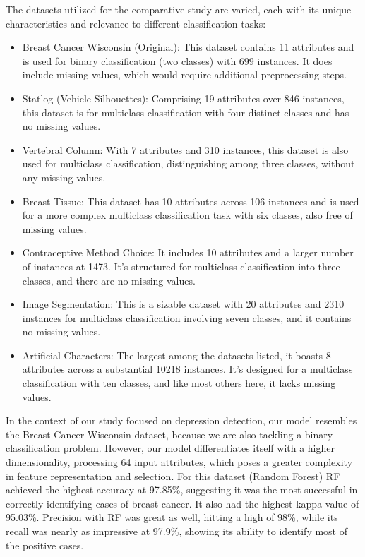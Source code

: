 The datasets utilized for the comparative study are varied, each with its unique characteristics and relevance to different classification tasks:
\begin{itemize}
 
\item Breast Cancer Wisconsin (Original): This dataset contains 11 attributes and is used for binary classification (two classes) with 699 instances. It does include missing values, which would require additional preprocessing steps.

\item Statlog (Vehicle Silhouettes): Comprising 19 attributes over 846 instances, this dataset is for multiclass classification with four distinct classes and has no missing values.

\item Vertebral Column: With 7 attributes and 310 instances, this dataset is also used for multiclass classification, distinguishing among three classes, without any missing values.

\item Breast Tissue: This dataset has 10 attributes across 106 instances and is used for a more complex multiclass classification task with six classes, also free of missing values.

\item Contraceptive Method Choice: It includes 10 attributes and a larger number of instances at 1473. It’s structured for multiclass classification into three classes, and there are no missing values.

\item Image Segmentation: This is a sizable dataset with 20 attributes and 2310 instances for multiclass classification involving seven classes, and it contains no missing values.

\item Artificial Characters: The largest among the datasets listed, it boasts 8 attributes across a substantial 10218 instances. It’s designed for a multiclass classification with ten classes, and like most others here, it lacks missing values.

\end{itemize}

In the context of our study focused on depression detection, our model resembles the Breast Cancer Wisconsin dataset, because we are also tackling a binary classification problem. However, our model differentiates itself with a higher dimensionality, processing 64 input attributes, which poses a greater complexity in feature representation and selection. For this dataset (Random Forest) RF achieved the highest accuracy at 97.85\%, suggesting it was the most successful in correctly identifying cases of breast cancer. It also had the highest kappa value of 95.03\%. Precision with RF was great as well, hitting a high of 98\%, while its recall was nearly as impressive at 97.9\%, showing its ability to identify most of the positive cases. 

